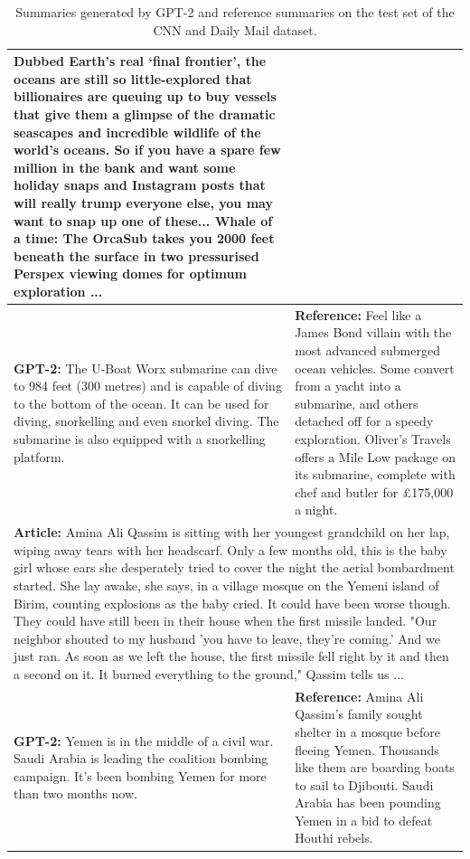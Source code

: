 \documentclass{article}
\begin{document}
{\begin{table}[t]
\begin{center}
\begin{tabular}{|p{8cm}|p{8cm}|}
{Dubbed Earth's real `final frontier', the oceans are still so little-explored that billionaires are queuing up to buy vessels that give them a glimpse of the dramatic seascapes and incredible wildlife of the world's oceans.
\newline
So if you have a spare few million in the bank and want some holiday snaps and Instagram posts that will really trump everyone else, you may want to snap up one of these...
\newline
Whale of a time: The OrcaSub takes you 2000 feet beneath the surface in two pressurised Perspex viewing domes for optimum exploration
\newline
...
} \\
\hline
\textbf{GPT-2:} The U-Boat Worx submarine can dive to 984 feet (300 metres) and is capable of diving to the bottom of the ocean. It can be used for diving, snorkelling and even snorkel diving. The submarine is also equipped with a snorkelling platform.
& \textbf{Reference:} Feel like a James Bond villain with the most advanced submerged ocean vehicles. Some convert from a yacht into a submarine, and others detached off for a speedy exploration. Oliver's Travels offers a Mile Low package on its submarine, complete with chef and butler for £175,000 a night.
\\
\hline
\multicolumn{2}{|C{16cm}|}{
\textbf{Article:} Amina Ali Qassim is sitting with her youngest grandchild on her lap, wiping away tears with her headscarf.
\newline
Only a few months old, this is the baby girl whose ears she desperately tried to cover the night the aerial bombardment started. She lay awake, she says, in a village mosque on the Yemeni island of Birim,
 counting explosions as the baby cried.
\newline
It could have been worse though. They could have still been in their house when the first missile landed.
\newline
"Our neighbor shouted to my husband 'you have to leave, they're coming.' And we just ran. As soon as we left the house, the first missile fell right by it and then a second on it. It burned everything to
the ground," Qassim tells us
\newline
...
} \\
\hline
\textbf{GPT-2:} Yemen is in the middle of a civil war. Saudi Arabia is leading the coalition bombing campaign. It's been bombing Yemen for more than two months now.
& \textbf{Reference:} Amina Ali Qassim's family sought shelter in a mosque before fleeing Yemen. Thousands like them are boarding boats to sail to Djibouti. Saudi Arabia has been pounding Yemen in a bid to defeat Houthi rebels.
\\
\hline
\end{tabular}
\caption{Summaries generated by GPT-2 and reference summaries on the test set of the CNN and Daily Mail dataset.}
\label{gensummaries}
\end{center}
\end{table}
}
\end{document}
